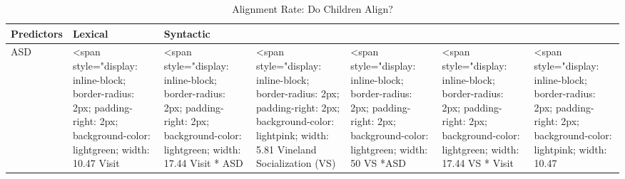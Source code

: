 \documentclass[article,30pt,extrafontsizes]{memoir}
\begin{document}
\begin{adjmulticols*}{3}{}{}
\begin{table}
\caption{\label{tab:table1}Alignment Rate: Do Children Align?}
\centering
\begin{tabular}[t]{l|l|l}
\hline
Predictors & Lexical & Syntactic\\
\hline
ASD & <span style="display: inline-block; border-radius: 2px; padding-right: 2px; background-color: lightgreen; width: 10.47%
\hline
Visit & <span style="display: inline-block; border-radius: 2px; padding-right: 2px; background-color: lightgreen; width: 17.44%
\hline
Visit * ASD & <span style="display: inline-block; border-radius: 2px; padding-right: 2px; background-color: lightpink; width: 5.81%
\hline
Vineland Socialization (VS) & <span style="display: inline-block; border-radius: 2px; padding-right: 2px; background-color: lightgreen; width: 50%
\hline
VS *ASD & <span style="display: inline-block; border-radius: 2px; padding-right: 2px; background-color: lightgreen; width: 17.44%
\hline
VS * Visit & <span style="display: inline-block; border-radius: 2px; padding-right: 2px; background-color: lightpink; width: 10.47%

\end{tabular}
\end{table}
\end{adjmulticols*}
\end{document}
